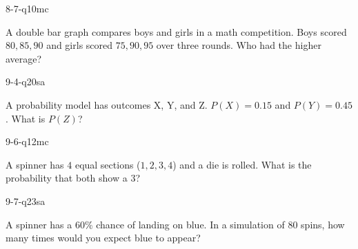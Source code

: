 \begin{practiceQuestion}{8-7-q10}{mc}
\begin{questionText}
A double bar graph compares boys and girls in a math competition. Boys scored $80, 85, 90$ and girls scored $75, 90, 95$ over three rounds. Who had the higher average?
\end{questionText}
\end{practiceQuestion}

\begin{practiceQuestion}{9-4-q20}{sa}
\begin{questionText}
A probability model has outcomes X, Y, and Z. $P(X) = 0.15$ and $P(Y) = 0.45$. What is $P(Z)$?
\end{questionText}
\end{practiceQuestion}

\begin{practiceQuestion}{9-6-q12}{mc}
\begin{questionText}
A spinner has $4$ equal sections ($1, 2, 3, 4$) and a die is rolled. What is the probability that both show a $3$?
\end{questionText}
\end{practiceQuestion}

\begin{practiceQuestion}{9-7-q23}{sa}
\begin{questionText}
A spinner has a $60\%$ chance of landing on blue. In a simulation of $80$ spins, how many times would you expect blue to appear?
\end{questionText}
\end{practiceQuestion}
